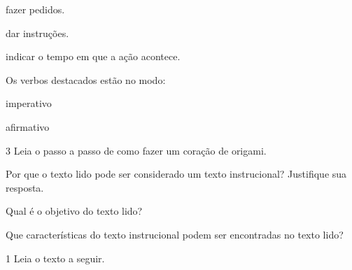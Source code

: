 \begin{escolha}
\begin{escolha}
\begin{boxlist}
\boxitem[\rosa{X}] fazer pedidos.

\boxitem[] dar instruções.

\boxitem[] indicar o tempo em que a ação acontece.
\end{boxlist}

\item
  Os verbos destacados estão no modo:

\begin{boxlist}
\boxitem[\rosa{X}] imperativo

\boxitem[] afirmativo
\end{boxlist}

\end{escolha}

\num{3} Leia o passo a passo de como fazer um coração de origami.



\begin{escolha}
\item Por que o texto lido pode ser considerado um texto instrucional? Justifique sua resposta.


\item Qual é o objetivo do texto lido?


\item Que características do texto instrucional podem ser encontradas no texto lido?



\num{1} Leia o texto a seguir.



\end{escolha}
\end{escolha}
